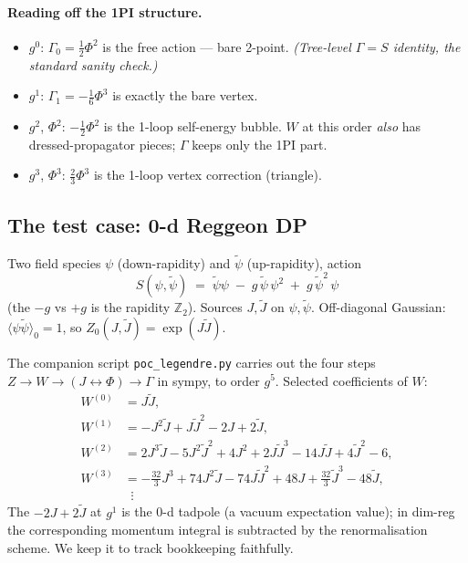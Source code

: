 \documentclass[11pt,a4paper]{article}
\begin{document}
\paragraph{Reading off the 1PI structure.}
\begin{itemize}[leftmargin=2em,itemsep=1pt]
  \item $g^0$: $\Gamma_0=\tfrac12\Phi^2$ is the free action --- bare 2-point. \emph{(Tree-level $\Gamma=S$ identity, the standard sanity check.)}
  \item $g^1$: $\Gamma_1=-\tfrac16\Phi^3$ is exactly the bare vertex.
  \item $g^2$, $\Phi^2$: $-\tfrac12\Phi^2$ is the 1-loop self-energy bubble. $W$ at this order \emph{also} has dressed-propagator pieces; $\Gamma$ keeps only the 1PI part.
  \item $g^3$, $\Phi^3$: $\tfrac23\Phi^3$ is the 1-loop vertex correction (triangle).
\end{itemize}

\subsection{The test case: 0-d Reggeon DP}

Two field species $\psi$ (down-rapidity) and $\tilde\psi$ (up-rapidity), action
\[
S(\psi,\tilde\psi) \;=\; \tilde\psi\psi \;-\; g\,\tilde\psi\,\psi^2 \;+\; g\,\tilde\psi^2\,\psi
\]
(the $-g$ vs $+g$ is the rapidity $\mathbb Z_2$). Sources $J,\tilde J$ on
$\psi,\tilde\psi$. Off-diagonal Gaussian: $\langle\psi\tilde\psi\rangle_0=1$,
so $Z_0(J,\tilde J)=\exp(J\tilde J)$.

The companion script \texttt{poc\_legendre.py} carries out the four steps
$Z \to W \to (J\leftrightarrow\Phi) \to \Gamma$ in sympy, to order $g^5$.
Selected coefficients of $W$:
\begin{align*}
W^{(0)} &= J\tilde J,\\
W^{(1)} &= -J^2\tilde J + J\tilde J^2 - 2J + 2\tilde J,\\
W^{(2)} &= 2J^3\tilde J - 5J^2\tilde J^2 + 4J^2 + 2J\tilde J^3 - 14J\tilde J + 4\tilde J^2 - 6,\\
W^{(3)} &= -\tfrac{32}{3}J^3 + 74J^2\tilde J - 74J\tilde J^2 + 48J + \tfrac{32}{3}\tilde J^3 - 48\tilde J,\\
&\;\;\vdots
\end{align*}
The $-2J + 2\tilde J$ at $g^1$ is the 0-d tadpole (a vacuum expectation value);
in dim-reg the corresponding momentum integral is subtracted by the
renormalisation scheme. We keep it to track bookkeeping faithfully.
\end{document}
